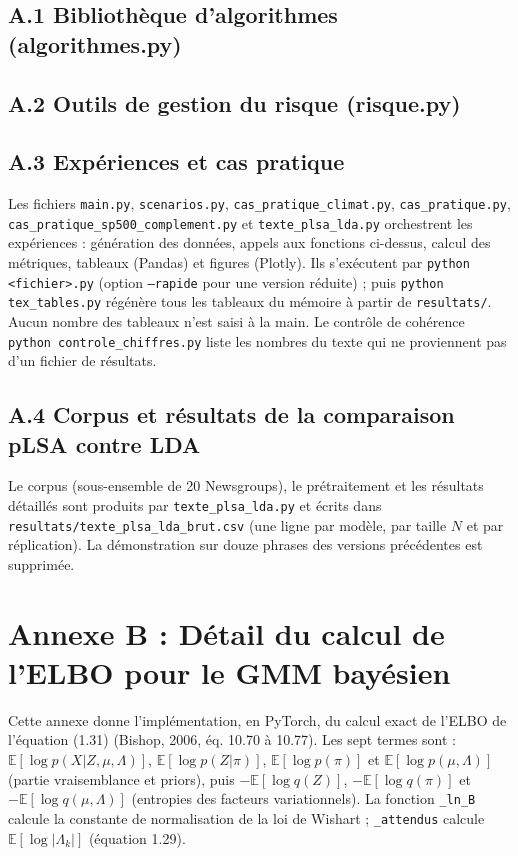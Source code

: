 \subsection*{A.1 Bibliothèque d'algorithmes (algorithmes.py)}


\subsection*{A.2 Outils de gestion du risque (risque.py)}


\subsection*{A.3 Expériences et cas pratique}
Les fichiers \texttt{main.py}, \texttt{scenarios.py}, \texttt{cas\_pratique\_climat.py}, \texttt{cas\_pratique.py}, \texttt{cas\_pratique\_sp500\_complement.py} et \texttt{texte\_plsa\_lda.py} orchestrent les expériences : génération des données, appels aux fonctions ci-dessus, calcul des métriques, tableaux (Pandas) et figures (Plotly). Ils s'exécutent par \texttt{python <fichier>.py} (option \texttt{--rapide} pour une version réduite) ; puis \texttt{python tex\_tables.py} régénère tous les tableaux du mémoire à partir de \texttt{resultats/}. Aucun nombre des tableaux n'est saisi à la main. Le contrôle de cohérence \texttt{python controle\_chiffres.py} liste les nombres du texte qui ne proviennent pas d'un fichier de résultats.

\subsection*{A.4 Corpus et résultats de la comparaison pLSA contre LDA}
Le corpus (sous-ensemble de 20 Newsgroups), le prétraitement et les résultats détaillés sont produits par \texttt{texte\_plsa\_lda.py} et écrits dans \texttt{resultats/texte\_plsa\_lda\_brut.csv} (une ligne par modèle, par taille $N$ et par réplication). La démonstration sur douze phrases des versions précédentes est supprimée.


\section*{Annexe B : Détail du calcul de l'ELBO pour le GMM bayésien}
Cette annexe donne l'implémentation, en PyTorch, du calcul exact de l'ELBO de l'équation (1.31) (Bishop, 2006, éq. 10.70 à 10.77). Les sept termes sont : $\mathbb{E}[\log p(X|Z,\mu ,\Lambda )]$, $\mathbb{E}[\log p(Z|\pi )]$, $\mathbb{E}[\log p(\pi )]$ et $\mathbb{E}[\log p(\mu ,\Lambda )]$ (partie vraisemblance et priors), puis $-\mathbb{E}[\log q(Z)]$, $-\mathbb{E}[\log q(\pi )]$ et $-\mathbb{E}[\log q(\mu ,\Lambda )]$ (entropies des facteurs variationnels). La fonction \texttt{\_ln\_B} calcule la constante de normalisation de la loi de Wishart ; \texttt{\_attendus} calcule $\mathbb{E}[\log |\Lambda _{k}|]$ (équation 1.29).


